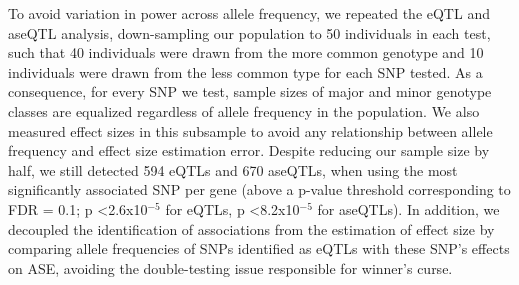 To avoid variation in power across allele frequency, we repeated the eQTL and aseQTL analysis, down-sampling our population to 50 individuals in each test, such that 40 individuals were drawn from the more common genotype and 10 individuals were drawn from the less common type for each SNP tested. As a consequence, for every SNP we test, sample sizes of major and minor genotype classes are equalized regardless of allele frequency in the population. We also measured effect sizes in this subsample to avoid any relationship between allele frequency and effect size estimation error. Despite reducing our sample size by half, we still detected 594 eQTLs and 670 aseQTLs, when using the most significantly associated SNP per gene (above a p-value threshold corresponding to FDR = 0.1; p \textless 2.6x10$^{-5}$ for eQTLs, p \textless 8.2x10$^{-5}$ for aseQTLs). In addition, we decoupled the identification of associations from the estimation of effect size by comparing allele frequencies of SNPs identified as eQTLs with these SNP’s effects on ASE, avoiding the double-testing issue responsible for winner’s curse.


